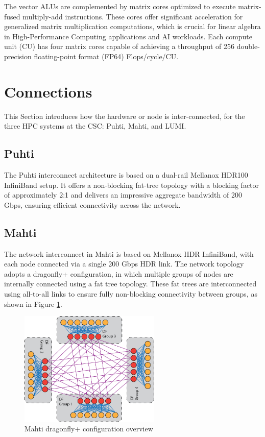 The vector ALUs are complemented by matrix cores optimized to execute matrix-fused multiply-add instructions. These cores offer significant acceleration for generalized matrix multiplication computations, which is crucial for linear algebra in High-Performance Computing applications and AI workloads. Each compute unit (CU) has four matrix cores capable of achieving a throughput of 256 double-precision floating-point format (FP64) Flops/cycle/CU.

\section{Connections}
This Section introduces how the hardware or node is inter-connected, for the three HPC systems at the CSC: Puhti, Mahti, and LUMI.

\subsection{Puhti}
The Puhti\cite{puhti} interconnect architecture is based on a dual-rail Mellanox HDR100 InfiniBand setup. It offers a non-blocking fat-tree topology with a blocking factor of approximately 2:1 and delivers an impressive aggregate bandwidth of 200 Gbps, ensuring efficient connectivity across the network.

\subsection{Mahti}
The network interconnect in Mahti is based on Mellanox HDR InfiniBand, with each node connected via a single 200 Gbps HDR link. The network topology adopts a dragonfly+ configuration, in which multiple groups of nodes are internally connected using a fat tree topology. These fat trees are interconnected using all-to-all links to ensure fully non-blocking connectivity between groups, as shown in Figure \ref{fig_mahti_df_ex}.

\begin{figure}[H]
    \centering
    \includegraphics[width=0.6\textwidth]{figures/mahti_df_ex.png}
    \caption{Mahti dragonfly+ configuration overview \cite{mahti}}
    \label{fig_mahti_df_ex}
\end{figure}

